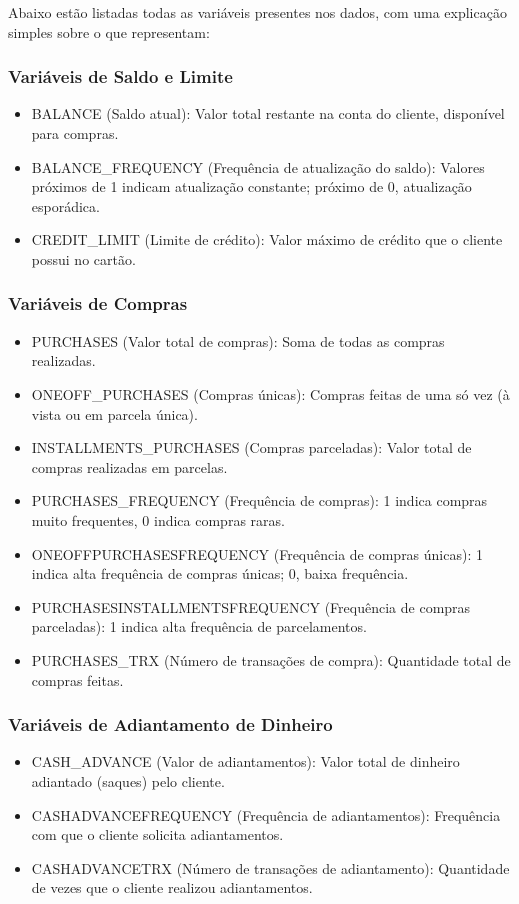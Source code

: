 \documentclass[12pt]{article}
\begin{document}
Abaixo estão listadas todas as variáveis presentes nos dados, com uma explicação simples sobre o que representam:

\subsubsection{Variáveis de Saldo e Limite}
\begin{itemize}
    \item BALANCE (Saldo atual): Valor total restante na conta do cliente, disponível para compras.
    \item BALANCE\_FREQUENCY (Frequência de atualização do saldo): Valores próximos de 1 indicam atualização constante; próximo de 0, atualização esporádica.
    \item CREDIT\_LIMIT (Limite de crédito): Valor máximo de crédito que o cliente possui no cartão.
\end{itemize}

\subsubsection{Variáveis de Compras}
\begin{itemize}
    \item PURCHASES (Valor total de compras): Soma de todas as compras realizadas.
    \item ONEOFF\_PURCHASES (Compras únicas): Compras feitas de uma só vez (à vista ou em parcela única).
    \item INSTALLMENTS\_PURCHASES (Compras parceladas): Valor total de compras realizadas em parcelas.
    \item PURCHASES\_FREQUENCY (Frequência de compras): 1 indica compras muito frequentes, 0 indica compras raras.
    \item ONEOFFPURCHASESFREQUENCY (Frequência de compras únicas): 1 indica alta frequência de compras únicas; 0, baixa frequência.
    \item PURCHASESINSTALLMENTSFREQUENCY (Frequência de compras parceladas): 1 indica alta frequência de parcelamentos.
    \item PURCHASES\_TRX (Número de transações de compra): Quantidade total de compras feitas.
\end{itemize}

\subsubsection{Variáveis de Adiantamento de Dinheiro}
\begin{itemize}
    \item CASH\_ADVANCE (Valor de adiantamentos): Valor total de dinheiro adiantado (saques) pelo cliente.
    \item CASHADVANCEFREQUENCY (Frequência de adiantamentos): Frequência com que o cliente solicita adiantamentos.
    \item CASHADVANCETRX (Número de transações de adiantamento): Quantidade de vezes que o cliente realizou adiantamentos.
\end{itemize}
\end{document}
